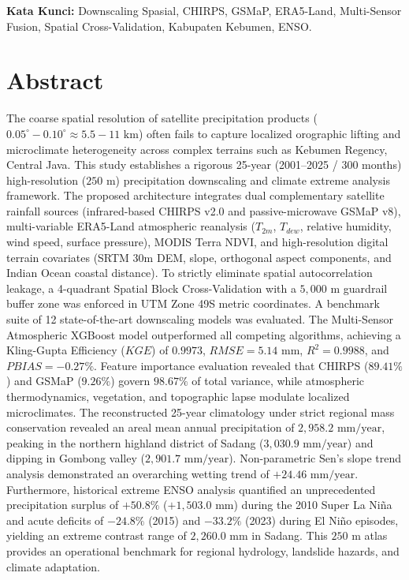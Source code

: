 \documentclass[11pt,a4paper,titlepage]{article}
\begin{document}
\vspace{0.4cm}
\noindent \textbf{Kata Kunci:} Downscaling Spasial, CHIRPS, GSMaP, ERA5-Land, Multi-Sensor Fusion, Spatial Cross-Validation, Kabupaten Kebumen, ENSO.

\vspace{0.8cm}

\section*{Abstract}
The coarse spatial resolution of satellite precipitation products ($0.05^\circ - 0.10^\circ \approx 5.5 - 11\text{ km}$) often fails to capture localized orographic lifting and microclimate heterogeneity across complex terrains such as Kebumen Regency, Central Java. This study establishes a rigorous 25-year (2001--2025 / 300 months) high-resolution ($250\text{ m}$) precipitation downscaling and climate extreme analysis framework. The proposed architecture integrates dual complementary satellite rainfall sources (infrared-based CHIRPS v2.0 and passive-microwave GSMaP v8), multi-variable ERA5-Land atmospheric reanalysis ($T_{2m}$, $T_{dew}$, relative humidity, wind speed, surface pressure), MODIS Terra NDVI, and high-resolution digital terrain covariates (SRTM 30m DEM, slope, orthogonal aspect components, and Indian Ocean coastal distance). To strictly eliminate spatial autocorrelation leakage, a 4-quadrant Spatial Block Cross-Validation with a $5,000\text{ m}$ guardrail buffer zone was enforced in UTM Zone 49S metric coordinates. A benchmark suite of 12 state-of-the-art downscaling models was evaluated. The Multi-Sensor Atmospheric XGBoost model outperformed all competing algorithms, achieving a Kling-Gupta Efficiency ($KGE$) of $0.9973$, $RMSE = 5.14\text{ mm}$, $R^2 = 0.9988$, and $PBIAS = -0.27\%$. Feature importance evaluation revealed that CHIRPS ($89.41\%$) and GSMaP ($9.26\%$) govern $98.67\%$ of total variance, while atmospheric thermodynamics, vegetation, and topographic lapse modulate localized microclimates. The reconstructed 25-year climatology under strict regional mass conservation revealed an areal mean annual precipitation of $2,958.2\text{ mm/year}$, peaking in the northern highland district of Sadang ($3,030.9\text{ mm/year}$) and dipping in Gombong valley ($2,901.7\text{ mm/year}$). Non-parametric Sen's slope trend analysis demonstrated an overarching wetting trend of $+24.46\text{ mm/year}$. Furthermore, historical extreme ENSO analysis quantified an unprecedented precipitation surplus of $+50.8\%$ ($+1,503.0\text{ mm}$) during the 2010 Super La Niña and acute deficits of $-24.8\%$ (2015) and $-33.2\%$ (2023) during El Niño episodes, yielding an extreme contrast range of $2,260.0\text{ mm}$ in Sadang. This $250\text{ m}$ atlas provides an operational benchmark for regional hydrology, landslide hazards, and climate adaptation.
\end{document}
